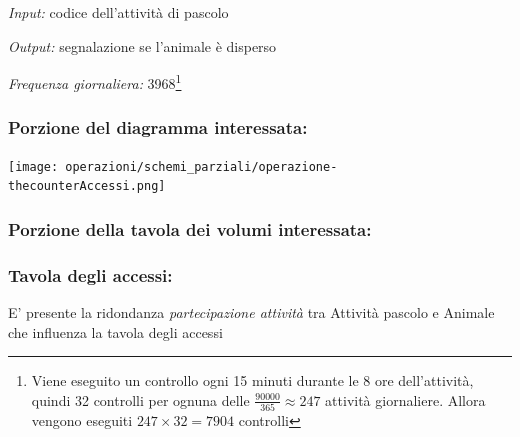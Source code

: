 \documentclass[12pt,a4paper]{article}
\begin{document}
\noindent\textit{Input:} codice dell'attività di pascolo

\noindent\textit{Output:} segnalazione se l'animale è disperso

\noindent\textit{Frequenza giornaliera:} 3968\footnote{Viene eseguito un controllo ogni 15 minuti durante le 8 ore dell'attività, quindi 32 controlli per ognuna delle $\frac{90000}{365}\approx 247$ attività giornaliere. Allora vengono eseguiti $247\times 32 = 7904$ controlli}

\subsubsection*{Porzione del diagramma interessata:}

\texttt{[image: operazioni/schemi\_parziali/operazione-\\thecounterAccessi.png]} 
\subsubsection*{Porzione della tavola dei volumi interessata:}

\subsubsection*{Tavola degli accessi:}

E' presente la ridondanza \textit{partecipazione attività} tra Attività pascolo e Animale che influenza la tavola degli accessi
\end{document}
